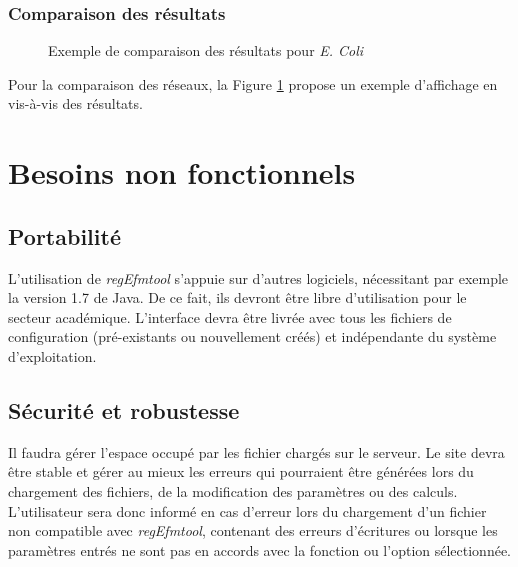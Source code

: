 \subsubsection{Comparaison des résultats}

\begin{figure}[!ht]
	\begin{center}
		\caption{Exemple de comparaison des résultats pour \textit{E. Coli}}
  		\label{comparaison}
  	\end{center}	
\end{figure}

Pour la comparaison des réseaux, la Figure \ref{comparaison} propose un exemple d'affichage en vis-à-vis des résultats. 

\section{Besoins non fonctionnels}

\subsection{Portabilité}
L'utilisation de \textit{regEfmtool} s'appuie sur d'autres logiciels, nécessitant par exemple la version 1.7 de Java. De ce fait, ils devront être libre d'utilisation pour le secteur académique. L'interface devra être livrée avec tous les fichiers de configuration (pré-existants ou nouvellement créés) et indépendante du système d'exploitation. 

\subsection{Sécurité et robustesse}
Il faudra gérer l'espace occupé par les fichier chargés sur le serveur. Le site devra être stable et gérer au mieux les erreurs qui pourraient être générées lors du chargement des fichiers, de la modification des paramètres ou des calculs. L'utilisateur sera donc informé en cas d'erreur lors du chargement d'un fichier non compatible avec \textit{regEfmtool}, contenant des erreurs d'écritures ou lorsque les paramètres entrés ne sont pas en accords avec la fonction ou l'option sélectionnée. 

